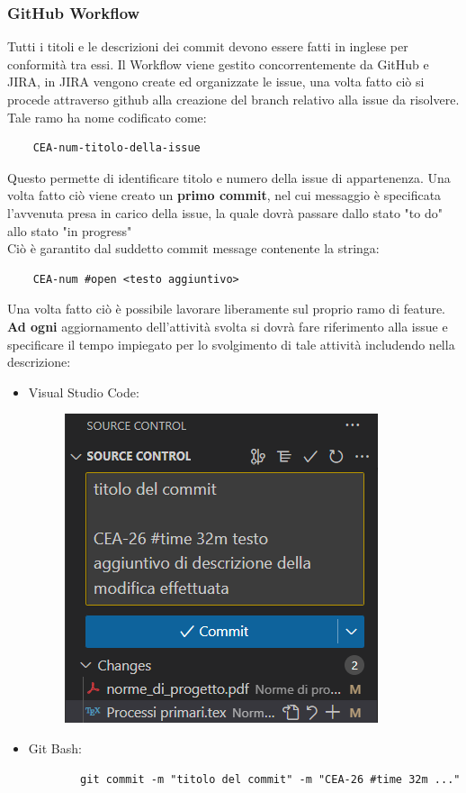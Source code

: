     \subsubsection{GitHub Workflow}
    Tutti i titoli e le descrizioni dei commit devono essere fatti in inglese per conformità tra essi.
    \newline Il Workflow viene gestito concorrentemente da GitHub e JIRA, in JIRA vengono create ed organizzate le issue, una volta fatto ciò si procede attraverso github alla creazione del branch relativo alla issue da risolvere.\\
    Tale ramo ha nome codificato come:
    \begin{lstlisting}
    CEA-num-titolo-della-issue
    \end{lstlisting}
    Questo permette di identificare titolo e numero della issue di appartenenza. Una volta fatto ciò viene creato un \textbf{primo commit}, nel cui messaggio è specificata l'avvenuta presa in carico della issue, la quale dovrà passare dallo stato "to do" allo stato "in progress"\\
    Ciò è garantito dal suddetto commit message contenente la stringa:
    \begin{lstlisting}
    CEA-num #open <testo aggiuntivo>
    \end{lstlisting}
    Una volta fatto ciò è possibile lavorare liberamente sul proprio ramo di feature.
    \newline \textbf{Ad ogni} aggiornamento dell'attività svolta si dovrà fare riferimento alla issue e specificare il tempo impiegato per lo svolgimento di tale attività includendo nella descrizione:
    \begin{itemize}
        \item Visual Studio Code:
        \begin{figure}[h!]
            \includegraphics[scale=0.65]{img/visual_code_example.png}
        \end{figure}
        \item Git Bash:
        \begin{lstlisting}
        git commit -m "titolo del commit" -m "CEA-26 #time 32m ..."
        \end{lstlisting}
    \end{itemize}
